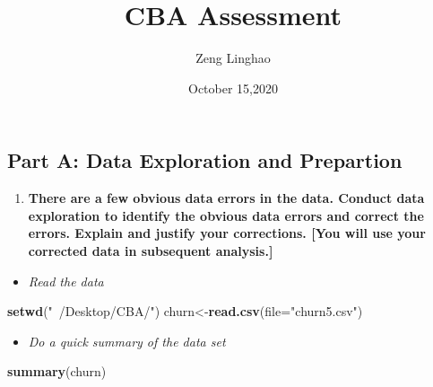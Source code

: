 \documentclass[]{article}
\title{CBA Assessment}
\author{Zeng Linghao}
\date{October 15,2020}
\newenvironment{Shaded}{\begin{snugshade}}{\end{snugshade}}
\newcommand{\DataTypeTok}[1]{\textcolor[rgb]{0.13,0.29,0.53}{#1}}
\newcommand{\KeywordTok}[1]{\textcolor[rgb]{0.13,0.29,0.53}{\textbf{#1}}}
\newcommand{\NormalTok}[1]{#1}
\newcommand{\StringTok}[1]{\textcolor[rgb]{0.31,0.60,0.02}{#1}}
\providecommand{\tightlist}{%
  \setlength{\itemsep}{0pt}\setlength{\parskip}{0pt}}
\begin{document}
\maketitle

\hypertarget{part-a-data-exploration-and-prepartion}{%
\subsection{Part A: Data Exploration and
Prepartion}\label{part-a-data-exploration-and-prepartion}}

\begin{enumerate}
\def\labelenumi{\arabic{enumi}.}
\tightlist
\item
  \textbf{There are a few obvious data errors in the data. Conduct data
  exploration to identify the obvious data errors and correct the
  errors. Explain and justify your corrections. {[}You will use your
  corrected data in subsequent analysis.{]}}
\end{enumerate}

\begin{itemize}
\tightlist
\item
  \emph{Read the data}
\end{itemize}

\begin{Shaded}
\begin{Highlighting}[]
\KeywordTok{setwd}\NormalTok{(}\StringTok{"~/Desktop/CBA/"}\NormalTok{)}
\NormalTok{churn<-}\KeywordTok{read.csv}\NormalTok{(}\DataTypeTok{file=}\StringTok{"churn5.csv"}\NormalTok{)}
\end{Highlighting}
\end{Shaded}

\begin{itemize}
\tightlist
\item
  \emph{Do a quick summary of the data set}
\end{itemize}

\begin{Shaded}
\begin{Highlighting}[]
\KeywordTok{summary}\NormalTok{(churn)}
\end{Highlighting}
\end{Shaded}
\end{document}
